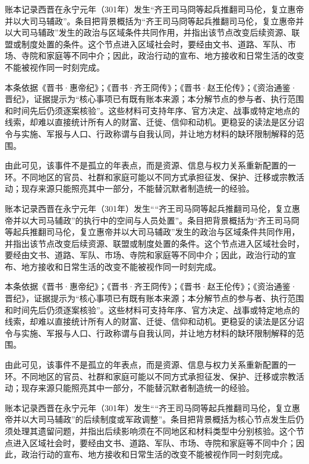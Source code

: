 账本记录西晋在永宁元年（301年）发生“齐王司马冏等起兵推翻司马伦，复立惠帝并以大司马辅政”。条目把背景概括为“齐王司马冏等起兵推翻司马伦，复立惠帝并以大司马辅政”发生的政治与区域条件共同作用，并指出该节点改变后续资源、联盟或制度处置的条件。这个节点进入区域社会时，要经由文书、道路、军队、市场、寺院和家庭等不同中介；因此，政治行动的宣布、地方接收和日常生活的改变不能被视作同一时刻完成。

本条依据《晋书·惠帝纪》；《晋书·齐王冏传》；《晋书·赵王伦传》；《资治通鉴·晋纪》，证据提示为“核心事项已有既有账本来源；本分解节点的参与者、执行范围和时间先后仍须逐案核验”。这些材料可支持年序、官方决定、战事或特定地点的线索，却难以直接统计所有人的财富、迁徙、信仰和动机。更稳妥的读法是区分诏令与实施、军报与人口、行政称谓与自我认同，并让地方材料的缺环限制解释的范围。

由此可见，该事件不是孤立的年表点，而是资源、信息与权力关系重新配置的一环。不同地区的官员、社群和家庭可能以不同方式承担征发、保护、迁移或宗教活动；现存来源只能照亮其中一部分，不能替沉默者制造统一的经验。

账本记录西晋在永宁元年（301年）发生““齐王司马冏等起兵推翻司马伦，复立惠帝并以大司马辅政”的执行中的空间与人员处置”。条目把背景概括为“齐王司马冏等起兵推翻司马伦，复立惠帝并以大司马辅政”发生的政治与区域条件共同作用，并指出该节点改变后续资源、联盟或制度处置的条件。这个节点进入区域社会时，要经由文书、道路、军队、市场、寺院和家庭等不同中介；因此，政治行动的宣布、地方接收和日常生活的改变不能被视作同一时刻完成。

本条依据《晋书·惠帝纪》；《晋书·齐王冏传》；《晋书·赵王伦传》；《资治通鉴·晋纪》，证据提示为“核心事项已有既有账本来源；本分解节点的参与者、执行范围和时间先后仍须逐案核验”。这些材料可支持年序、官方决定、战事或特定地点的线索，却难以直接统计所有人的财富、迁徙、信仰和动机。更稳妥的读法是区分诏令与实施、军报与人口、行政称谓与自我认同，并让地方材料的缺环限制解释的范围。

由此可见，该事件不是孤立的年表点，而是资源、信息与权力关系重新配置的一环。不同地区的官员、社群和家庭可能以不同方式承担征发、保护、迁移或宗教活动；现存来源只能照亮其中一部分，不能替沉默者制造统一的经验。

账本记录西晋在永宁元年（301年）发生““齐王司马冏等起兵推翻司马伦，复立惠帝并以大司马辅政”的后续制度或军政调整”。条目把背景概括为核心节点发生后仍须处理其遗留问题，并指出后续影响须在不同地区和材料类型中分别核验。这个节点进入区域社会时，要经由文书、道路、军队、市场、寺院和家庭等不同中介；因此，政治行动的宣布、地方接收和日常生活的改变不能被视作同一时刻完成。


